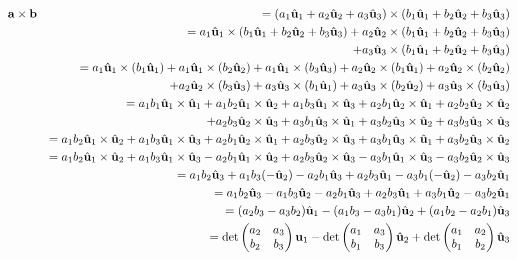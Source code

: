 \documentclass[12pt]{amsbook}
\begin{document}
\begin{eqnarray*}
{\bf a}\times{\bf b}&&=(a_1\hat{\bf u}_1+a_2\hat{\bf u}_2+a_3\hat{\bf u}_3)\times(b_1\hat{\bf u}_1+b_2\hat{\bf u}_2+b_3\hat{\bf u}_3)\\
&&=a_1\hat{\bf u}_1\times(b_1\hat{\bf u}_1+b_2\hat{\bf u}_2+b_3\hat{\bf u}_3)+a_2\hat{\bf u}_2\times(b_1\hat{\bf u}_1+b_2\hat{\bf u}_2+b_3\hat{\bf u}_3)\\
&& \ \ \ +a_3\hat{\bf u}_3\times(b_1\hat{\bf u}_1+b_2\hat{\bf u}_2+b_3\hat{\bf u}_3)\\
&&=a_1\hat{\bf u}_1\times(b_1\hat{\bf u}_1)+a_1\hat{\bf u}_1\times(b_2\hat{\bf u}_2)+a_1\hat{\bf u}_1\times(b_3\hat{\bf u}_3)+a_2\hat{\bf u}_2\times(b_1\hat{\bf u}_1)+a_2\hat{\bf u}_2\times(b_2\hat{\bf u}_2)\\
&& \ \ \ +a_2\hat{\bf u}_2\times(b_3\hat{\bf u}_3) +a_3\hat{\bf u}_3\times(b_1\hat{\bf u}_1)+a_3\hat{\bf u}_3\times(b_2\hat{\bf u}_2)+a_3\hat{\bf u}_3\times(b_3\hat{\bf u}_3)\\
&&=a_1b_1\hat{\bf u}_1\times\hat{\bf u}_1+a_1b_2\hat{\bf u}_1\times\hat{\bf u}_2+a_1b_3\hat{\bf u}_1\times\hat{\bf u}_3+a_2b_1\hat{\bf u}_2\times\hat{\bf u}_1+a_2b_2\hat{\bf u}_2\times\hat{\bf u}_2\\
&& \ \ \ +a_2b_3\hat{\bf u}_2\times\hat{\bf u}_3 +a_3b_1\hat{\bf u}_3\times\hat{\bf u}_1+a_3b_2\hat{\bf u}_3\times\hat{\bf u}_2+a_3b_3\hat{\bf u}_3\times\hat{\bf u}_3\\
&&=a_1b_2\hat{\bf u}_1\times\hat{\bf u}_2+a_1b_3\hat{\bf u}_1\times\hat{\bf u}_3+a_2b_1\hat{\bf u}_2\times\hat{\bf u}_1+a_2b_3\hat{\bf u}_2\times\hat{\bf u}
_3+a_3b_1\hat{\bf u}_3\times\hat{\bf u}_1+a_3b_2\hat{\bf u}_3\times\hat{\bf u}_2\\
&&=a_1b_2\hat{\bf u}_1\times\hat{\bf u}_2+a_1b_3\hat{\bf u}_1\times\hat{\bf u}
_3-a_2b_1\hat{\bf u}_1\times\hat{\bf u}_2+a_2b_3\hat{\bf u}_2\times\hat{\bf u}
_3-a_3b_1\hat{\bf u}_1\times\hat{\bf u}
_3-a_3b_2\hat{\bf u}_2\times\hat{\bf u}_3\\
&&=a_1b_2\hat{\bf u}_3+a_1b_3(-\hat{\bf u}_2)-a_2b_1\hat{\bf u}_3+a_2b_3\hat{\bf u}_1-a_3b_1(-\hat{\bf u}_2)-a_3b_2\hat{\bf u}_1\\
&&=a_1b_2\hat{\bf u}_3-a_1b_3\hat{\bf u}_2-a_2b_1\hat{\bf u}_3+a_2b_3\hat{\bf u}_1+a_3b_1\hat{\bf u}_2-a_3b_2\hat{\bf u}_1\\
&&=(a_2b_3-a_3b_2)\hat{\bf u}_1-(a_1b_3-a_3b_1)\hat{\bf u}_2+(a_1b_2-a_2b_1)\hat{\bf u}_3\\
&&=\det\begin{pmatrix}a_2 & a_3 \\ b_2 & b_3\end{pmatrix}{\bf u}_1-\det\begin{pmatrix}a_1 & a_3 \\ b_1 & b_3\end{pmatrix}\hat{\bf u}_2+\det\begin{pmatrix}a_1 & a_2 \\ b_1 & b_2\end{pmatrix}\hat{\bf u}_3\\

\end{eqnarray*}
\end{document}
